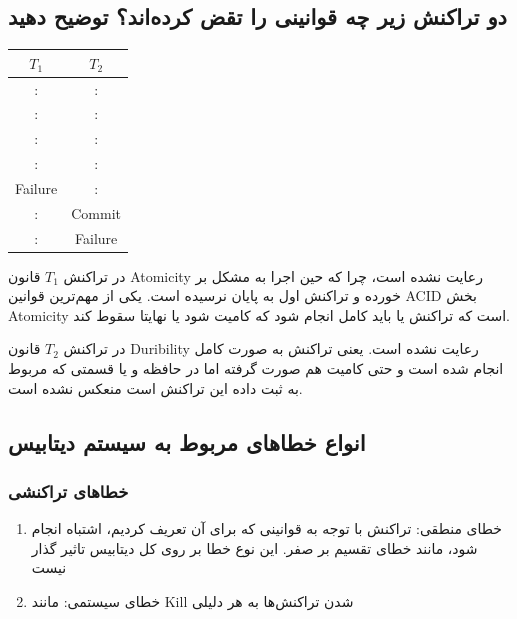 \documentclass[a4paper]{article}
\begin{document}
\subsection*{دو تراکنش زیر چه قوانینی را تقض کرده‌اند؟ توضیح دهید}

\begin{LTR}
    \begin{table}[h]
        \begin{RTL}
        \end{RTL}
        \centering
            \begin{tabular}{c|c}
                $T_1$ & $T_2$ \\ \hline
                : & : \\
                : & : \\
                : & : \\
                : & : \\
                Failure & : \\
                : & Commit \\
                : & Failure
            \end{tabular}
    \end{table}
\end{LTR}

در تراکنش $T_1$ قانون Atomicity رعایت نشده است، چرا که حین اجرا به مشکل بر خورده
و تراکنش اول به پایان نرسیده است. یکی از مهم‌ترین قوانین ACID بخش Atomicity است
که تراکنش یا باید کامل انجام شود که کامیت شود یا نهایتا سقوط کند.

در تراکنش $T_2$ قانون Duribility رعایت نشده است. یعنی تراکنش به صورت کامل انجام
شده است و حتی کامیت هم صورت گرفته اما در حافظه و یا قسمتی که مربوط به ثبت داده
این تراکنش است منعکس نشده است.

\subsection{انواع خطا‌های مربوط به سیستم دیتابیس}

\subsubsection{خطا‌های تراکنشی}

\begin{enumerate}
    \item خطای منطقی: تراکنش با توجه به قوانینی که برای آن تعریف کردیم، اشتباه
    انجام شود، مانند خطای تقسیم بر صفر. این نوع خطا بر روی کل دیتابیس تاثیر گذار
    نیست
    \item خطای سیستمی: مانند Kill شدن تراکنش‌ها به هر دلیلی
\end{enumerate}
\end{document}
